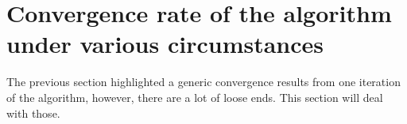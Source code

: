 \documentclass[12pt]{article}
\begin{document}
\section{Convergence rate of the algorithm under various circumstances}
    The previous section highlighted a generic convergence results from one iteration of the algorithm, however, there are a lot of loose ends. 
    This section will deal with those. 
\end{document}
